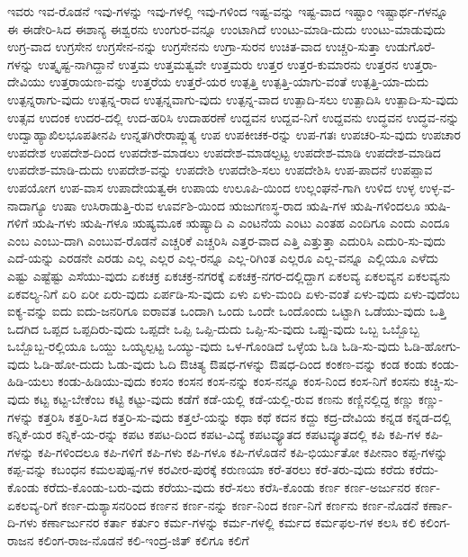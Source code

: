 ಇವರು
ಇವ-ರೊಡನೆ
ಇವು-ಗಳನ್ನು
ಇವು-ಗಳಲ್ಲಿ
ಇವು-ಗಳಿಂದ
ಇಷ್ಟ-ವನ್ನು
ಇಷ್ಟ-ವಾದ
ಇಷ್ಟಾಂ
ಇಷ್ಟಾರ್ಥ-ಗಳನ್ನೂ
ಈ
ಈಡೇರಿ-ಸಿದ
ಈಶಾನ್ಯ
ಈಶ್ವರನು
ಉಂಗುರ-ವನ್ನೂ
ಉಂಟಾಗಿದೆ
ಉಂಟು-ಮಾಡಿ-ದುದು
ಉಂಟು-ಮಾಡುವುದು
ಉಗ್ರ-ವಾದ
ಉಗ್ರಸೇನ
ಉಗ್ರಸೇನ-ನನ್ನು
ಉಗ್ರಸೇನನು
ಉಗ್ರಾ-ಸುರನ
ಉಚಿತ-ವಾದ
ಉಚ್ಚರಿ-ಸುತ್ತಾ
ಉಡುಗೊರೆ-ಗಳನ್ನು
ಉತ್ಕೃಷ್ಟ-ನಾಗಿದ್ದಾನೆ
ಉತ್ತಮ
ಉತ್ತಮತ್ವವೇ
ಉತ್ತಮರು
ಉತ್ತರ
ಉತ್ತರ-ಕುಮಾರನು
ಉತ್ತರನ
ಉತ್ತರಾ-ದೇವಿಯು
ಉತ್ತರಾಯಣ-ವನ್ನು
ಉತ್ತರೆಯ
ಉತ್ತರೆ-ಯರ
ಉತ್ಪತ್ತಿ
ಉತ್ಪತ್ತಿ-ಯಾಗು-ವಂತೆ
ಉತ್ಪತ್ತಿ-ಯಾ-ದುದು
ಉತ್ಪನ್ನರಾಗು-ವುದು
ಉತ್ಪನ್ನ-ರಾದ
ಉತ್ಪನ್ನವಾಗು-ವುದು
ಉತ್ಪನ್ನ-ವಾದ
ಉತ್ಪಾದಿ-ಸಲು
ಉತ್ಪಾದಿಸಿ
ಉತ್ಪಾದಿ-ಸು-ವುದು
ಉತ್ಸವ
ಉದಂಕ
ಉದರ-ದಲ್ಲಿ
ಉದ-ಹರಿಸಿ
ಉದಾಹರಣೆ
ಉದ್ದವನ
ಉದ್ದವ-ನಿಗೆ
ಉದ್ದವನು
ಉದ್ಧವನ
ಉದ್ಧವ-ನನ್ನು
ಉದ್ವಾಹ್ಯಾಖಿಲಭೂಪತೀನಪಿ
ಉನ್ನತಗಿರೇರಾಪ್ಲುತ್ಯ
ಉಪ
ಉಪಕೀಚಕ-ರನ್ನು
ಉಪ-ಗತಃ
ಉಪಚರಿ-ಸು-ವುದು
ಉಪಚಾರ
ಉಪದೇಶ
ಉಪದೇಶ-ದಿಂದ
ಉಪದೇಶ-ಮಾಡಲು
ಉಪದೇಶ-ಮಾಡಲ್ಪಟ್ಟ
ಉಪದೇಶ-ಮಾಡಿ
ಉಪದೇಶ-ಮಾಡಿದ
ಉಪದೇಶ-ಮಾಡಿ-ದುದು
ಉಪದೇಶ-ವನ್ನು
ಉಪದೇಶಿ
ಉಪದೇಶಿ-ಸಲು
ಉಪದೇಶಿಸಿ
ಉಪ-ಪಾದನೆ
ಉಪಪ್ಪಾವ
ಉಪಯೋಗ
ಉಪ-ವಾಸ
ಉಪಾದೇಯತ್ವಈ
ಉಪಾಯ
ಉಲೂಪಿ-ಯಿಂದ
ಉಲ್ಲಂಘನೆ-ಗಾಗಿ
ಉಳಿದ
ಉಳ್ಳ
ಉಳ್ಳ-ವ-ನಾದಾಗ್ಯೂ
ಉಷಾ
ಉಸಿರಾಡುತ್ತಿ-ರುವ
ಊರ್ವಶಿ-ಯಿಂದ
ಋಜುಗಣಸ್ಥ-ರಾದ
ಋಷಿ-ಗಳ
ಋಷಿ-ಗಳಿಂದಲೂ
ಋಷಿ-ಗಳಿಗೆ
ಋಷಿ-ಗಳು
ಋಷಿ-ಗಳೂ
ಋಷ್ಯಮೂಕ
ಋಷ್ಯಾದಿ
ಎ
ಎಂಟನೆಯ
ಎಂಟು
ಎಂತಹ
ಎಂದಿಗೂ
ಎಂದು
ಎಂದೂ
ಎಂಬ
ಎಂಬು-ದಾಗಿ
ಎಂಬುವ-ರೊಡನೆ
ಎಚ್ಚರಿಕೆ
ಎಚ್ಚರಿಸಿ
ಎತ್ತರ-ವಾದ
ಎತ್ತಿ
ಎತ್ತುತ್ತಾ
ಎದುರಿಸಿ
ಎದುರಿ-ಸು-ವುದು
ಎದೆ-ಯನ್ನು
ಎರಡನೇ
ಎರಡು
ಎಲ್ಲ
ಎಲ್ಲರ
ಎಲ್ಲ-ರನ್ನೂ
ಎಲ್ಲ-ರಿಗಿಂತ
ಎಲ್ಲರೂ
ಎಲ್ಲ-ವನ್ನೂ
ಎಲ್ಲಿಯೂ
ಎಳೆದು
ಎಷ್ಟು
ಎಷ್ಟೆಷ್ಟು
ಎಸೆಯು-ವುದು
ಏಕಚಕ್ರ
ಏಕಚಕ್ರ-ನಗರಕ್ಕೆ
ಏಕಚಕ್ರ-ನಗರ-ದಲ್ಲಿದ್ದಾಗ
ಏಕಲವ್ಯ
ಏಕಲವ್ಯನ
ಏಕಲವ್ಯನು
ಏಕವಲ್ಯ-ನಿಗೆ
ಏರಿ
ಏರೀ
ಏರು-ವುದು
ಏರ್ಪಡಿ-ಸು-ವುದು
ಏಳು
ಏಳು-ಮಂದಿ
ಏಳು-ವಂತೆ
ಏಳು-ವುದು
ಏಳು-ವುದೆಂಬ
ಐಕ್ಯ-ವನ್ನು
ಐದು
ಐದು-ಜನರಿಗೂ
ಐರಾವತ
ಒಂದಾಗಿ
ಒಂದು
ಒಂದೇ
ಒಂದೊಂದು
ಒಟ್ಟಾಗಿ
ಒಡೆಯು-ವುದು
ಒತ್ತಿ
ಒದಗಿದ
ಒಪ್ಪದ
ಒಪ್ಪದಿರು-ವುದು
ಒಪ್ಪದೇ
ಒಪ್ಪಿ
ಒಪ್ಪಿ-ದುದು
ಒಪ್ಪಿ-ಸು-ವುದು
ಒಪ್ಪು-ವುದು
ಒಬ್ಬ
ಒಬ್ಬೊಬ್ಬ
ಒಬ್ಬೊಬ್ಬ-ರಲ್ಲಿಯೂ
ಒಯ್ದು
ಒಯ್ಯಲ್ಪಟ್ಟ
ಒಯ್ಯು-ವುದು
ಒಳ-ಗೊಂಡಿದೆ
ಒಳ್ಳೆಯ
ಓಡಿ
ಓಡಿ-ಸು-ವುದು
ಓಡಿ-ಹೋಗು-ವುದು
ಓಡಿ-ಹೋ-ದುದು
ಓಡು-ವುದು
ಓದಿ
ಔಚಿತ್ಯ
ಔಷಧ-ಗಳನ್ನು
ಔಷಧ-ದಿಂದ
ಕಂಕಣ-ವನ್ನು
ಕಂಡ
ಕಂಡು
ಕಂಡು-ಹಿಡಿ-ಯಲು
ಕಂಡು-ಹಿಡಿಯು-ವುದು
ಕಂಸಂ
ಕಂಸನ
ಕಂಸ-ನನ್ನು
ಕಂಸ-ನನ್ನೂ
ಕಂಸ-ನಿಂದ
ಕಂಸ-ನಿಗೆ
ಕಂಸನು
ಕಚ್ಚಿ-ಸು-ವುದು
ಕಟ್ಟ
ಕಟ್ಟ-ಬೇಕೆಂಬ
ಕಟ್ಟಿ
ಕಟ್ಟು-ವುದು
ಕಡೆಗೆ
ಕಡೆ-ಯಲ್ಲಿ
ಕಡೆ-ಯಲ್ಲಿ-ರುವ
ಕಣನು
ಕಣ್ಣಿನಲ್ಲಿದ್ದ
ಕಣ್ಣು
ಕಣ್ಣು-ಗಳನ್ನು
ಕತ್ತರಿಸಿ
ಕತ್ತರಿ-ಸಿದ
ಕತ್ತರಿ-ಸು-ವುದು
ಕತ್ತಲೆ-ಯನ್ನು
ಕಥಾ
ಕಥೆ
ಕದನ
ಕದ್ದು
ಕದ್ರ-ದೇವಿಯ
ಕನ್ನಡ
ಕನ್ನಡ-ದಲ್ಲಿ
ಕನ್ನಿಕೆ-ಯರ
ಕನ್ನಿಕೆ-ಯ-ರನ್ನು
ಕಪಟ
ಕಪಟ-ದಿಂದ
ಕಪಟ-ವಿದ್ಯೆ
ಕಪಟವ್ಯೂತದ
ಕಪಟವ್ಯೂತದಲ್ಲಿ
ಕಪಿ
ಕಪಿ-ಗಳ
ಕಪಿ-ಗಳನ್ನು
ಕಪಿ-ಗಳಿಂದಲೂ
ಕಪಿ-ಗಳಿಗೆ
ಕಪಿ-ಗಳು
ಕಪಿ-ಗಳೂ
ಕಪಿ-ಗಳೊಡನೆ
ಕಪಿ-ಭಿರ್ಯುತೋ
ಕಪೀನಾಂ
ಕಪ್ಪ-ಗಳನ್ನು
ಕಪ್ಪ-ವನ್ನು
ಕಬಂಧನ
ಕಮಲಪುಷ್ಪ-ಗಳ
ಕರವೀರ-ಪುರಕ್ಕೆ
ಕರುಣಯಾ
ಕರೆ-ತರಲು
ಕರೆ-ತರು-ವುದು
ಕರೆದು
ಕರೆದು-ಕೊಂಡು
ಕರೆದು-ಕೊಂಡು-ಬರು-ವುದು
ಕರೆಯು-ವುದು
ಕರೆ-ಸಲು
ಕರೆಸಿ-ಕೊಂಡು
ಕರ್ಣ
ಕರ್ಣ-ಅರ್ಜುನರ
ಕರ್ಣ-ಏಕಲವ್ಯ-ರಿಗೆ
ಕರ್ಣ-ದುಶ್ಯಾಸನರಿಂದ
ಕರ್ಣನ
ಕರ್ಣ-ನನ್ನು
ಕರ್ಣ-ನಿಂದ
ಕರ್ಣ-ನಿಗೆ
ಕರ್ಣನು
ಕರ್ಣ-ನೊಡನೆ
ಕರ್ಣಾ-ದಿ-ಗಳು
ಕರ್ಣಾರ್ಜುನರ
ಕರ್ತಾ
ಕರ್ತುಂ
ಕರ್ಮ-ಗಳನ್ನು
ಕರ್ಮ-ಗಳಲ್ಲಿ
ಕರ್ಮದ
ಕರ್ಮಫಲ-ಗಳ
ಕಲಸಿ
ಕಲಿ
ಕಲಿಂಗ-ರಾಜನ
ಕಲಿಂಗ-ರಾಜ-ನೊಡನೆ
ಕಲಿ-ಇಂದ್ರ-ಜಿತ್
ಕಲಿಗೂ
ಕಲಿಗೆ
